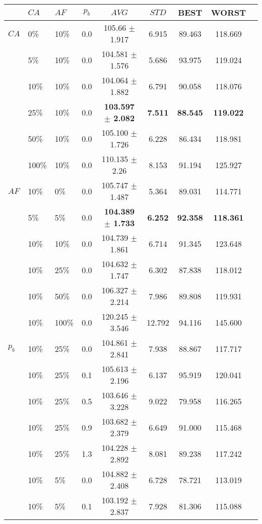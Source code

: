 \begin{table}
    \centering
    \begin{tabular}{|l|l|l|c||c|c|c|c|c|}
    \hline
    ~ & $CA$ & $AF$ & $p_b$ & $AVG$ & $STD$ &BEST & WORST \\
    \hline
    $CA$ & 0\% & 10\% & 0.0 & 105.66 $\pm$ 1.917 & 6.915 & 89.463 & 118.669\\
    ~ & 5\% & 10\% & 0.0 & 104.581 $\pm$ 1.576 & 5.686 & 93.975 & 119.024\\
    ~ & 10\% & 10\% & 0.0 & 104.064 $\pm$ 1.882 & 6.791 & 90.058 & 118.076\\
    ~ & 25\% & 10\% & 0.0 & \textbf{103.597 $\pm$ 2.082} & \textbf{7.511} & \textbf{88.545} & \textbf{119.022}\\
    ~ & 50\% & 10\% & 0.0 & 105.100 $\pm$ 1.726 & 6.228 & 86.434 & 118.981\\
    ~ & 100\% & 10\% & 0.0 & 110.135 $\pm$ 2.26 & 8.153 & 91.194 & 125.927\\
    \hline
    $AF$ & 10\% & 0\% & 0.0 & 105.747 $\pm$ 1.487 & 5.364& 89.031 & 114.771\\
    ~ & 5\% & 5\% & 0.0 & \textbf{104.389 $\pm$ 1.733} & \textbf{6.252}& \textbf{92.358} & \textbf{118.361}\\
    ~ & 10\% & 10\% & 0.0 & 104.739 $\pm$ 1.861 & 6.714 & 91.345 & 123.648\\
    ~ & 10\% & 25\% & 0.0 & 104.632 $\pm$ 1.747 & 6.302 & 87.838 & 118.012\\
    ~ & 10\% & 50\% & 0.0 & 106.327 $\pm$ 2.214 & 7.986 & 89.808 & 119.931\\
    ~ & 10\% & 100\% & 0.0 & 120.245 $\pm$ 3.546 & 12.792 & 94.116 & 145.600\\
    \hline
    $p_b$ & 10\% & 25\% & 0.0 & 104.861 $\pm$ 2.841 & 7.938 & 88.867 & 117.717\\
    ~ & 10\% & 25\% & 0.1 & 105.613 $\pm$ 2.196 & 6.137 & 95.919 & 120.041\\
    ~ & 10\% & 25\% & 0.5 & 103.646 $\pm$ 3.228 & 9.022 & 79.958 & 116.265\\
    ~ & 10\% & 25\% & 0.9 & 103.682 $\pm$ 2.379 & 6.649 & 91.000 & 115.468\\
    ~ & 10\% & 25\% & 1.3 & 104.228 $\pm$ 2.892 & 8.081 & 89.238 & 117.242\\
    ~ & 10\% & 5\% & 0.0 & 104.882 $\pm$ 2.408 & 6.728 & 78.721 & 113.019\\
    ~ & 10\% & 5\% & 0.1 & 103.192 $\pm$ 2.837 & 7.928 & 81.306 & 115.088\\

\end{tabular}
\end{table}
